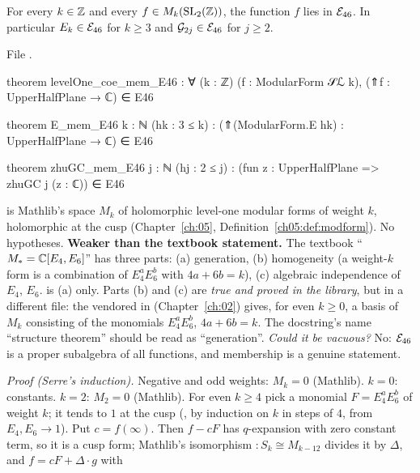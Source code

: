 \begin{theorem}\label{l14:thm:levelone}
For every $k\in{\mathbb{Z}}$ and every $f\in M_k(\mathrm{SL}_2(\mathbb{Z}))$, the function $f$ lies in $\mathcal{E}_{46}$. In particular $E_k\in\mathcal{E}_{46}$
for $k\ge3$ and $\mathcal G_{2j}\in\mathcal{E}_{46}$ for $j\ge2$.
\end{theorem}
\noindent File .
\begin{leancode}
theorem levelOne_coe_mem_E46 : ∀ (k : ℤ) (f : ModularForm 𝒮ℒ k),
    (⇑f : UpperHalfPlane → ℂ) ∈ E46

theorem E_mem_E46 {k : ℕ} (hk : 3 ≤ k) :
    (⇑(ModularForm.E hk) : UpperHalfPlane → ℂ) ∈ E46

theorem zhuGC_mem_E46 {j : ℕ} (hj : 2 ≤ j) :
    (fun z : UpperHalfPlane => zhuGC j (z : ℂ)) ∈ E46
\end{leancode}
\begin{dictionary}
 is Mathlib's space $M_k$ of holomorphic level-one modular forms of weight $k$, holomorphic at the cusp
(Chapter~\ref{ch:05}, Definition~\ref{ch05:def:modform}). No hypotheses. \textbf{Weaker than the textbook statement.} The
textbook ``$M_* = {\mathbb{C}}[E_4,E_6]$'' has three parts: (a) generation, (b) homogeneity (a weight-$k$ form is a combination of
$E_4^aE_6^b$ with $4a+6b=k$), (c) algebraic independence of $E_4$, $E_6$.  is (a) only. Parts (b)
and (c) are \emph{true and proved in the library}, but in a different file: the vendored
 in 
(Chapter~\ref{ch:02}) gives, for even $k\ge0$, a basis of $M_k$ consisting of the monomials $E_4^aE_6^b$, $4a+6b=k$. The
docstring's name ``structure theorem'' should be read as ``generation''. \emph{Could it be vacuous?} No: $\mathcal{E}_{46}$ is a
proper subalgebra of all functions, and membership is a genuine statement.
\end{dictionary}
\noindent\emph{Proof (Serre's induction).} Negative and odd weights: $M_k = 0$ (Mathlib). $k=0$: constants. $k=2$: $M_2 = 0$
(Mathlib). For even $k\ge4$ pick a monomial $F = E_4^aE_6^b$ of weight $k$; it tends to $1$ at the cusp
(, by induction on $k$ in steps of $4$, from $E_4,E_6\to1$). Put $c = f(\infty)$. Then
$f - cF$ has $q$-expansion with zero constant term, so it is a cusp form; Mathlib's isomorphism
 $:S_k\cong M_{k-12}$ divides it by $\Delta$, and $f = cF + \Delta\cdot g$ with
